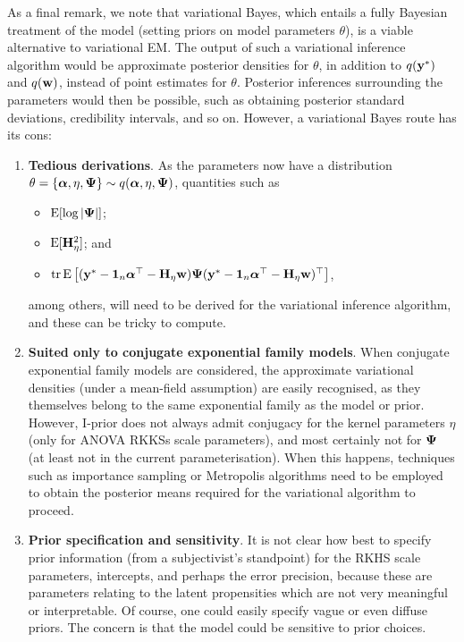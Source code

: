 \documentclass[showframe,11pt,twoside,openright]{report}
\begin{document}
As a final remark, we note that variational Bayes, which entails a fully Bayesian treatment of the model (setting priors on model parameters $\theta$), is a viable alternative to variational EM.
The output of such a variational inference algorithm would be approximate posterior densities for $\theta$, in addition to $q({\mathbf y}^*)$ and $q({\mathbf w})$, instead of point estimates for $\theta$.
Posterior inferences surrounding the parameters would then be possible, such as obtaining posterior standard deviations, credibility intervals, and so on.
However, a variational Bayes route has its cons:
\begin{enumerate}
  \item \textbf{Tedious derivations}. As the parameters now have a distribution $\theta = \{{\bm\alpha},\eta,{\bm\Psi}\} \sim q({\bm\alpha},\eta,{\bm\Psi})$, quantities such as
  \begin{itemize}
    \item $\operatorname{E}[\log \vert {\bm\Psi} \vert]$;
    \item $\operatorname{E}[{\mathbf H}_\eta^2]$; and
    \item $\operatorname{tr} \operatorname{E}\big[ ({\mathbf y}^*-{\mathbf 1}_n{\bm\alpha}^\top - {\mathbf H}_\eta{\mathbf w}){\bm\Psi} ({\mathbf y}^*-{\mathbf 1}_n{\bm\alpha}^\top - {\mathbf H}_\eta{\mathbf w})^\top \big]$,
  \end{itemize}
  among others, will need to be derived for the variational inference algorithm, and these can be tricky to compute.
  
  \item \textbf{Suited only to conjugate exponential family models}. When conjugate exponential family models are considered, the approximate variational densities (under a mean-field assumption) are easily recognised, as they themselves belong to the same exponential family as the model or prior. However, I-prior does not always admit conjugacy for the kernel parameters $\eta$ (only for ANOVA RKKSs scale parameters), and most certainly not for ${\bm\Psi}$ (at least not in the current parameterisation). When this happens, techniques such as importance sampling or Metropolis algorithms need to be employed to obtain the posterior means required for the variational algorithm to proceed.
  
  \item \textbf{Prior specification and sensitivity}. It is not clear how best to specify prior information (from a subjectivist's standpoint) for the RKHS scale parameters, intercepts, and perhaps the error precision, because these are parameters relating to the latent propensities which are not very meaningful or interpretable. Of course, one could easily specify vague or even diffuse priors. The concern is that the model could be sensitive to prior choices.
\end{enumerate}
\end{document}
